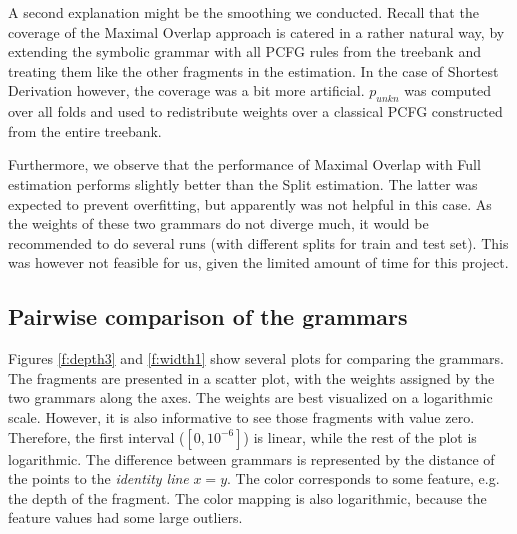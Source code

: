 A second explanation might be the smoothing we conducted. Recall that the coverage of the Maximal Overlap approach is catered in a rather natural way, by extending the symbolic grammar with all PCFG rules from the treebank and treating them like the other fragments in the estimation. In the case of Shortest Derivation however, the coverage was a bit more artificial. $p_{unkn}$ was computed over all folds and used to redistribute weights over a classical PCFG constructed from the entire treebank. 


Furthermore, we observe that the performance of Maximal Overlap with Full estimation performs slightly better than the Split estimation. The latter was expected to prevent overfitting, but apparently was not helpful in this case. As the weights of these two grammars do not diverge much, it would be recommended to do several runs (with different splits for train and test set). This was however not feasible for us, given the limited amount of time for this project.


\subsection{Pairwise comparison of the grammars}
Figures \ref{f:depth3} and \ref{f:width1} show several plots for comparing the grammars. The fragments are presented in a scatter plot, with the weights assigned by the two grammars along the axes. The weights are best visualized on a logarithmic scale. However, it is also informative to see those fragments with value zero. Therefore, the first interval ($[0,10^{-6}]$) is linear, while the rest of the plot is logarithmic. 
The difference between grammars is represented by the distance of the points to the \emph{identity line} $x=y$.
The color corresponds to some feature, e.g. the depth of the fragment. The color mapping is also logarithmic, because the feature values had some large outliers. 

